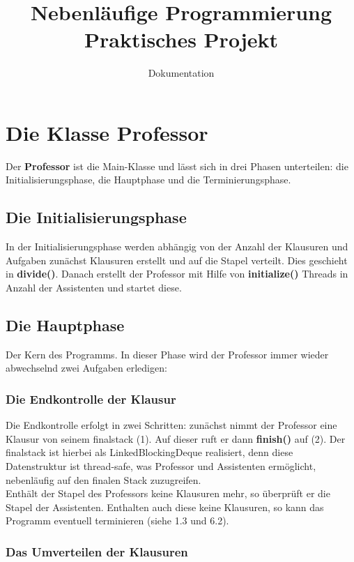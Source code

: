 \documentclass[12pt,a4paper]{article}
\title{Nebenläufige Programmierung\\Praktisches Projekt}
\author{Dokumentation}
\begin{document}
\maketitle

\tableofcontents

\newpage
\section{Die Klasse Professor}

Der \textbf{Professor} ist die Main-Klasse und lässt sich in drei Phasen unterteilen: die Initialisierungsphase, die Hauptphase und die Terminierungsphase.
\subsection{Die Initialisierungsphase}

In der Initialisierungsphase werden abhängig von der Anzahl der Klausuren und Aufgaben zunächst Klausuren erstellt und auf die Stapel verteilt. Dies geschieht in \textbf{divide()}.  Danach erstellt der Professor mit Hilfe von \textbf{initialize()} Threads in Anzahl der Assistenten und startet diese.

\subsection{Die Hauptphase}
Der Kern des Programms. In dieser Phase wird der Professor immer wieder abwechselnd zwei Aufgaben erledigen: 

\subsubsection{Die Endkontrolle der Klausur}
Die Endkontrolle erfolgt in zwei Schritten: zunächst nimmt der Professor eine Klausur von seinem finalstack (1). Auf dieser ruft er dann \textbf{finish()} auf (2). Der finalstack ist hierbei als LinkedBlockingDeque realisiert, denn diese Datenstruktur ist thread-safe, was Professor und Assistenten ermöglicht, nebenläufig auf den finalen Stack zuzugreifen. \\
Enthält der Stapel des Professors keine Klausuren mehr, so überprüft er die Stapel der Assistenten. Enthalten auch diese keine Klausuren, so kann das Programm eventuell terminieren (siehe 1.3 und 6.2).

\subsubsection{Das Umverteilen der Klausuren}
\end{document}
